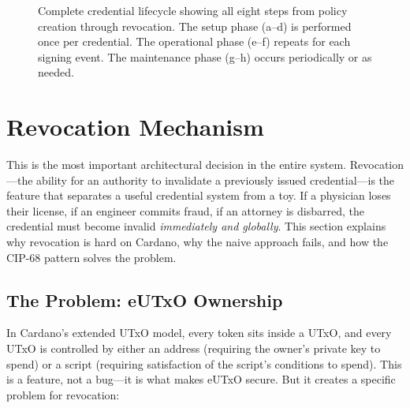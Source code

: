 \begin{figure}[p]
\caption{Complete credential lifecycle showing all eight steps from policy creation through revocation. The setup phase (a--d) is performed once per credential. The operational phase (e--f) repeats for each signing event. The maintenance phase (g--h) occurs periodically or as needed.}
\label{fig:ch5-lifecycle}
\end{figure}


\section{Revocation Mechanism}
\label{sec:ch5-revocation}

This is the most important architectural decision in the entire system. Revocation---the ability for an authority to invalidate a previously issued credential---is the feature that separates a useful credential system from a toy. If a physician loses their license, if an engineer commits fraud, if an attorney is disbarred, the credential must become invalid \emph{immediately and globally}. This section explains why revocation is hard on Cardano, why the naive approach fails, and how the CIP-68 pattern solves the problem.

\subsection{The Problem: eUTxO Ownership}

In Cardano's extended UTxO model, every token sits inside a UTxO, and every UTxO is controlled by either an address (requiring the owner's private key to spend) or a script (requiring satisfaction of the script's conditions to spend). This is a feature, not a bug---it is what makes eUTxO secure. But it creates a specific problem for revocation:

